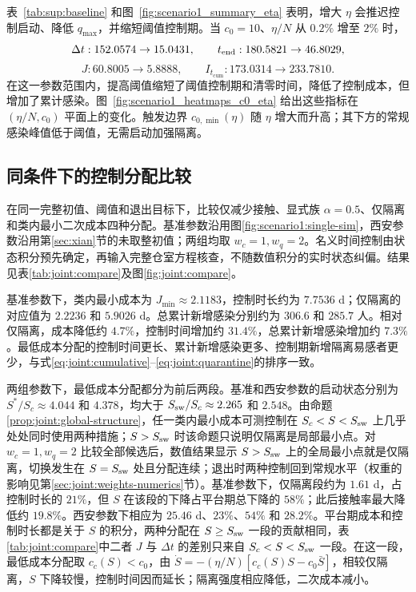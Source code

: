 \documentclass[lang=cn,a4paper,newtx]{elegantpaper}
\numberwithin{equation}{section}
\theoremstyle{plain}
\newcommand{\Itcum}{I_{t_{\mathrm{cum}}}}
\begin{document}
表~\ref*{tab:sup:baseline} 和图~\ref{fig:scenario1_summary_eta} 表明，增大 $\eta$ 会推迟控制启动、降低 $q_{\max}$，并缩短阈值控制期。当 $c_0=10$、$\eta/N$ 从 $0.2\%$ 增至 $2\%$ 时，
\[
\Delta t:152.0574\to15.0431,\qquad
t_{\rm end}:180.5821\to46.8029,
\]
\[
J:60.8005\to5.8888,\qquad
\Itcum:173.0314\to233.7810.
\]
在这一参数范围内，提高阈值缩短了阈值控制期和清零时间，降低了控制成本，但增加了累计感染。图~\ref{fig:scenario1_heatmaps_c0_eta} 给出这些指标在 $(\eta/N,c_0)$ 平面上的变化。触发边界 $c_{0,\min}(\eta)$ 随 $\eta$ 增大而升高；其下方的常规感染峰值低于阈值，无需启动加强隔离。

\FloatBarrier
\subsection{同条件下的控制分配比较}
\label{sec:joint:compare-numerics}
在同一完整初值、阈值和退出目标下，比较仅减少接触、显式族 $\alpha=0.5$、仅隔离和类内最小二次成本四种分配。基准参数沿用图\ref{fig:scenario1:single-sim}，西安参数沿用第\ref{sec:xian}节的未取整初值；两组均取 $w_c=1,w_q=2$。名义时间控制由状态积分预先确定，再输入完整仓室方程核查，不随数值积分的实时状态纠偏。结果见表\ref{tab:joint:compare}及图\ref{fig:joint:compare}。

基准参数下，类内最小成本为 $J_{\min}\approx2.1183$，控制时长约为 $7.7536$ d；仅隔离的对应值为 $2.2236$ 和 $5.9026$ d。总累计新增感染分别约为 $306.6$ 和 $285.7$ 人。相对仅隔离，成本降低约 $4.7\%$，控制时间增加约 $31.4\%$，总累计新增感染增加约 $7.3\%$。最低成本分配的控制时间更长、累计新增感染更多、控制期新增隔离易感者更少，与式\eqref{eq:joint:cumulative}--\eqref{eq:joint:quarantine}的排序一致。

两组参数下，最低成本分配都分为前后两段。基准和西安参数的启动状态分别为 $S^*/S_c\approx4.044$ 和 $4.378$，均大于 $S_{\rm sw}/S_c\approx2.265$ 和 $2.548$。由命题\ref{prop:joint:global-structure}，任一类内最小成本可测控制在 $S_c<S<S_{\rm sw}$ 上几乎处处同时使用两种措施；$S>S_{\rm sw}$ 时该命题只说明仅隔离是局部最小点。对 $w_c=1,w_q=2$ 比较全部候选后，数值结果显示 $S>S_{\rm sw}$ 上的全局最小点就是仅隔离，切换发生在 $S=S_{\rm sw}$ 处且分配连续；退出时两种控制回到常规水平（权重的影响见第\ref{sec:joint:weights-numerics}节）。基准参数下，仅隔离段约为 $1.61$ d，占控制时长的 $21\%$，但 $S$ 在该段的下降占平台期总下降的 $58\%$；此后接触率最大降低约 $19.8\%$。西安参数下相应为 $25.46$ d、$23\%$、$54\%$ 和 $28.2\%$。平台期成本和控制时长都是关于 $S$ 的积分，两种分配在 $S\ge S_{\rm sw}$ 一段的贡献相同，表\ref{tab:joint:compare}中二者 $J$ 与 $\Delta t$ 的差别只来自 $S_c<S<S_{\rm sw}$ 一段。在这一段，最低成本分配取 $c_c(S)<c_0$，由 $\dot S=-(\eta/N)[c_c(S)S-c_0\bar S]$，相较仅隔离，$S$ 下降较慢，控制时间因而延长；隔离强度相应降低，二次成本减小。
\end{document}
